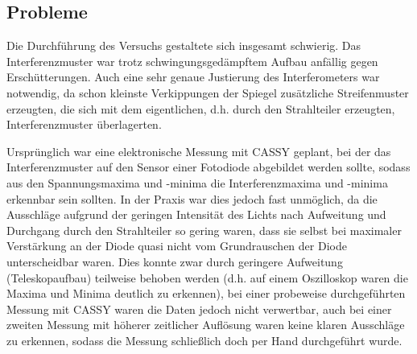 \subsection{Probleme}
Die Durchführung des Versuchs gestaltete sich insgesamt schwierig. Das Interferenzmuster war trotz schwingungsgedämpftem Aufbau anfällig gegen Erschütterungen. Auch eine sehr genaue Justierung des Interferometers war notwendig, da schon kleinste Verkippungen der Spiegel zusätzliche Streifenmuster erzeugten, die sich mit dem eigentlichen, d.h. durch den Strahlteiler erzeugten, Interferenzmuster überlagerten.

Ursprünglich war eine elektronische Messung mit CASSY geplant, bei der das Interferenzmuster auf den Sensor einer Fotodiode abgebildet werden sollte, sodass aus den Spannungsmaxima und -minima die Interferenzmaxima und -minima erkennbar sein sollten.
In der Praxis war dies jedoch fast unmöglich, da die Ausschläge aufgrund der geringen Intensität des Lichts nach Aufweitung und Durchgang durch den Strahlteiler so gering waren, dass sie selbst bei maximaler Verstärkung an der Diode quasi nicht vom Grundrauschen der Diode unterscheidbar waren. Dies konnte zwar durch geringere Aufweitung (Teleskopaufbau) teilweise behoben werden (d.h. auf einem Oszilloskop waren die Maxima und Minima deutlich zu erkennen), bei einer probeweise durchgeführten Messung mit CASSY waren die Daten jedoch nicht verwertbar, auch bei einer zweiten Messung mit höherer zeitlicher Auflösung waren keine klaren Ausschläge zu erkennen, sodass die Messung schließlich doch per Hand durchgeführt wurde.